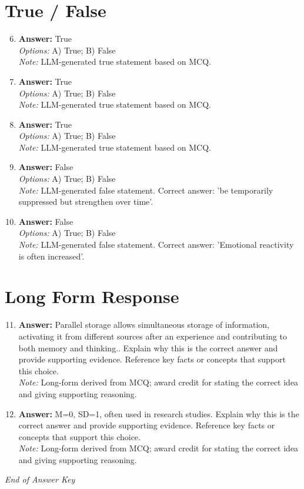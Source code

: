 \documentclass[12pt]{article}
\begin{document}
\section*{True / False}
\begin{enumerate}[label=\arabic*.]
\setcounter{enumi}{5}
\item \textbf{Answer:} True
\\ \textit{Options:} A) True; B) False
\\ \textit{Note:} LLM-generated true statement based on MCQ.
\item \textbf{Answer:} True
\\ \textit{Options:} A) True; B) False
\\ \textit{Note:} LLM-generated true statement based on MCQ.
\item \textbf{Answer:} True
\\ \textit{Options:} A) True; B) False
\\ \textit{Note:} LLM-generated true statement based on MCQ.
\item \textbf{Answer:} False
\\ \textit{Options:} A) True; B) False
\\ \textit{Note:} LLM-generated false statement. Correct answer: 'be temporarily suppressed but strengthen over time'.
\item \textbf{Answer:} False
\\ \textit{Options:} A) True; B) False
\\ \textit{Note:} LLM-generated false statement. Correct answer: 'Emotional reactivity is often increased'.
\end{enumerate}

\section*{Long Form Response}
\begin{enumerate}[label=\arabic*.]
\setcounter{enumi}{10}
\item \textbf{Answer:} Parallel storage allows simultaneous storage of information, activating it from different sources after an experience and contributing to both memory and thinking.. Explain why this is the correct answer and provide supporting evidence. Reference key facts or concepts that support this choice.
\\ \textit{Note:} Long-form derived from MCQ; award credit for stating the correct idea and giving supporting reasoning.
\item \textbf{Answer:} M=0, SD=1, often used in research studies. Explain why this is the correct answer and provide supporting evidence. Reference key facts or concepts that support this choice.
\\ \textit{Note:} Long-form derived from MCQ; award credit for stating the correct idea and giving supporting reasoning.
\end{enumerate}

\vfill
\noindent\textit{End of Answer Key}
\end{document}
